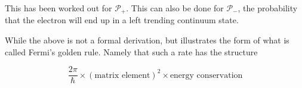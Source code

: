 This has been worked out for $\mathcal{P}_{+}$.  This can also be done for $\mathcal{P}_{-}$, the probability that the electron will end up in a left trending continuum state.

While the above is not a formal derivation, but illustrates the form of what is called Fermi's golden rule.  Namely that such a rate has the structure

\begin{equation}\label{eqn:qmTwoL10:570}
\frac{2 \pi}{\hbar} \times (\text{matrix element})^2 \times \text{energy conservation}
\end{equation}

\EndArticle
